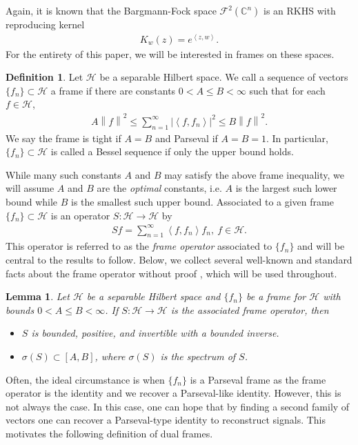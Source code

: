 \documentclass{amsart}
\newtheorem{lem}[thm]{Lemma}
\theoremstyle{definition}
\newtheorem{definition}[thm]{Definition}
\theoremstyle{remark}
\numberwithin{equation}{section}
\newcommand{\ip}[2]{\left\langle {#1} , {#2} \right\rangle} %
\newcommand{\norm}[1]{\left\lVert #1 \right\rVert} %
\begin{document}
Again, it is known \cite{Z12} that the Bargmann-Fock space $\mathcal{F}^{2}(\mathbb{C}^{n})$ is an RKHS with reproducing kernel 
\begin{align*}
    K_{w}(z)=e^{\ip{z}{w}}. 
\end{align*}
For the entirety of this paper, we will be interested in frames on these spaces. 
\begin{definition}
    Let $\mathcal{H}$ be a separable Hilbert space. We call a sequence of vectors $\{f_{n}\} \subset \mathcal{H}$ a frame if there are constants $0<A\leq B<\infty$ such that for each $f\in\mathcal{H}$,
    \begin{align*}
        A\norm{f}^{2}\leq \sum_{n=1}^{\infty}\left|\ip{f}{f_{n}}\right|^{2}\leq B\norm{f}^{2}.
    \end{align*}
    We say the frame is tight if $A=B$ and Parseval if $A=B=1$. In particular, $\{f_{n}\}\subset\mathcal{H}$ is called a Bessel sequence if only the upper bound holds.  
\end{definition}
While many such constants $A$ and $B$ may satisfy the above frame inequality, we will assume $A$ and $B$ are the \textit{optimal} constants, i.e. $A$ is the largest such lower bound while $B$ is the smallest such upper bound. Associated to a given frame $\{f_{n}\} \subset \mathcal{H}$ is an operator $S:\mathcal{H}\to\mathcal{H}$ by 
\begin{align*}
    Sf=\sum_{n=1}^{\infty}\ip{f}{f_{n}}f_{n}, \ f \in \mathcal{H}.
\end{align*}
This operator is referred to as the \textit{frame operator} associated to $\{f_{n}\}$ and will be central to the results to follow. Below, we collect several well-known and standard facts about the frame operator without proof \cite{christensen2003introduction}, which will be used throughout. 
\begin{lem}\label{lemma:frame_operator}
    Let $\mathcal{H}$ be a separable Hilbert space and  $\{f_{n}\}$ be a frame for $\mathcal{H}$ with bounds $0<A\leq B<\infty$. If $S:\mathcal{H}\to\mathcal{H}$ is the associated frame operator, then 
    \begin{itemize}
        \item[1.] $S$ is bounded, positive, and invertible with a bounded inverse. 
        \item[2.] $\sigma(S)\subset [A,B]$, where $\sigma(S)$ is the spectrum of $S$. 
    \end{itemize}
\end{lem}

Often, the ideal circumstance is when $\{f_{n}\}$ is a Parseval frame as the frame operator is the identity and we recover a Parseval-like identity. However, this is not always the case. In this case, one can hope that by finding a second family of vectors one can recover a Parseval-type identity to reconstruct signals. This motivates the following definition of dual frames. 
\end{document}
